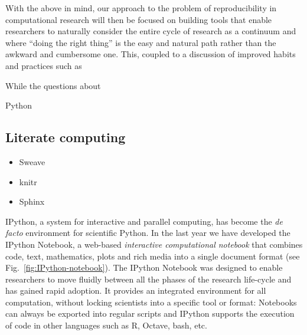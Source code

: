 \documentclass[ChapterTOCs,krantz2]{krantz} %
\begin{document}
With the above in mind, our approach to the problem of reproducibility in
computational research will then be focused on building tools that enable
researchers to naturally consider the entire cycle of research as a continuum
and where ``doing the right thing'' is the easy and natural path rather than
the awkward and cumbersome one.  This, coupled to a discussion of improved
habits and practices such as 

While the questions about

Python 

\subsection{Literate computing}

\begin{itemize}
\item Sweave
\item knitr
\item Sphinx
\end{itemize}


IPython, a system for interactive and parallel computing, has become the \emph{
  de facto} environment for scientific Python. In the last year we have
developed the IPython Notebook, a web-based \emph{ interactive computational
  notebook} that combines code, text, mathematics, plots and rich media into a
single document format (see Fig.~\ref{fig:IPython-notebook}).  The IPython
Notebook was designed to enable researchers to move fluidly between all the
phases of the research life-cycle and has gained rapid adoption. It provides an
integrated environment for all computation, without locking scientists into a
specific tool or format: Notebooks can always be exported into regular scripts
and IPython supports the execution of code in other languages such as R,
Octave, bash, etc.
\end{document}
